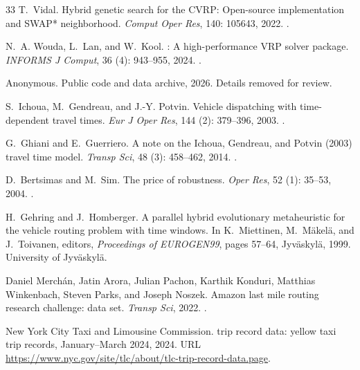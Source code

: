 \documentclass[12pt,letterpaper]{article}
\begin{document}
\begin{thebibliography}{33}
T.~Vidal.
\newblock Hybrid genetic search for the {CVRP}: Open-source implementation and
  {SWAP*} neighborhood.
\newblock \emph{Comput Oper Res}, 140: 105643, 2022.
\newblock {}.

N.~A. Wouda, L.~Lan, and W.~Kool.
: A high-performance {VRP} solver package.
\newblock \emph{INFORMS J Comput}, 36 (4): 943--955, 2024.
\newblock {}.

{Anonymous}.
\newblock Public code and data archive, 2026{}.
\newblock Details removed for review.

S.~Ichoua, M.~Gendreau, and J.-Y. Potvin.
\newblock Vehicle dispatching with time-dependent travel times.
\newblock \emph{Eur J Oper Res}, 144 (2): 379--396, 2003.
\newblock {}.

G.~Ghiani and E.~Guerriero.
\newblock A note on the {Ichoua}, {Gendreau}, and {Potvin} (2003) travel time
  model.
\newblock \emph{Transp Sci}, 48 (3): 458--462, 2014.
\newblock {}.

D.~Bertsimas and M.~Sim.
\newblock The price of robustness.
\newblock \emph{Oper Res}, 52 (1): 35--53, 2004.
\newblock {}.

H.~Gehring and J.~Homberger.
\newblock A parallel hybrid evolutionary metaheuristic for the vehicle routing
  problem with time windows.
\newblock In K.~Miettinen, M.~M{\"a}kel{\"a}, and J.~Toivanen, editors,
  \emph{Proceedings of {EUROGEN99}}, pages 57--64, Jyv{\"a}skyl{\"a}, 1999.
  University of Jyv{\"a}skyl{\"a}.

Daniel Merch{\'a}n, Jatin Arora, Julian Pachon, Karthik Konduri, Matthias
  Winkenbach, Steven Parks, and Joseph Noszek.
 {Amazon} last mile routing research challenge: data set.
\newblock \emph{Transp Sci}, 2022.
\newblock {}.

{New York City Taxi and Limousine Commission}.
 trip record data: yellow taxi trip records, {January}--{March}
  2024, 2024.
\newblock URL
  \url{https://www.nyc.gov/site/tlc/about/tlc-trip-record-data.page}.


\end{thebibliography}
\end{document}
